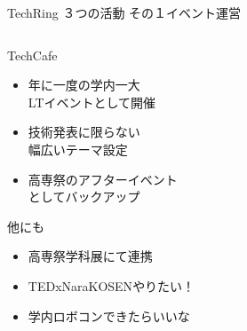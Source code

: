 \documentclass[dvipdfmx]{beamer}
\begin{document}
\begin{frame}{TechRing ３つの活動 その１}{イベント運営}
  \begin{columns}[totalwidth=\textwidth]
    \begin{column}{0.55\textwidth}
      \begin{alertblock}{TechCafe}
        \begin{itemize}
          \item 年に一度の学内一大\\LTイベントとして開催
          \item 技術発表に限らない\\幅広いテーマ設定
          \item 高専祭のアフターイベント\\としてバックアップ
        \end{itemize}
      \end{alertblock}

      \begin{block}{他にも}
        \begin{footnotesize}
          \begin{itemize}
            \item 高専祭学科展にて連携
            \item \alert{TEDxNaraKOSEN}やりたい！
            \item 学内ロボコンできたらいいな
          \end{itemize}
        \end{footnotesize}
      \end{block}
    \end{column}


\end{columns}
\end{frame}
\end{document}
